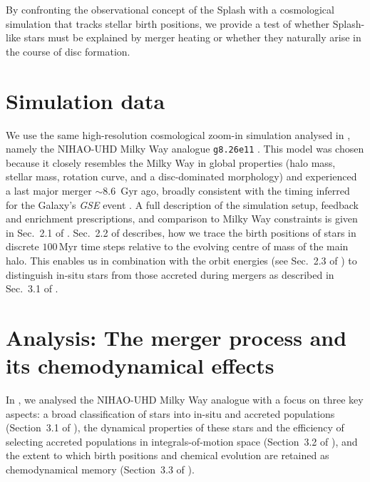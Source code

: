 \documentclass[fleqn,usenatbib]{mnras}
\begin{document}
By confronting the observational concept of the Splash with a cosmological simulation that tracks stellar birth positions, we provide a test of whether Splash-like stars must be explained by merger heating or whether they naturally arise in the course of disc formation.

\section{Simulation data}
\label{sec:data}

We use the same high-resolution cosmological zoom-in simulation analysed in , namely the NIHAO-UHD Milky Way analogue \texttt{g8.26e11} \citep{Wang2015, Buck2019b, Buck2020b, Buck2021}. This model was chosen because it closely resembles the Milky Way in global properties (halo mass, stellar mass, rotation curve, and a disc-dominated morphology) and experienced a last major merger $\sim 8.6$~Gyr ago, broadly consistent with the timing inferred for the Galaxy’s \textit{GSE} event \citep{Helmi2018, Naidu2020}. A full description of the simulation setup, feedback and enrichment prescriptions, and comparison to Milky Way constraints is given in Sec.~2.1 of . Sec.~2.2 of  describes, how we trace the birth positions of stars in discrete $100\,\mathrm{Myr}$ time steps relative to the evolving centre of mass of the main halo. This enables us in combination with the orbit energies (see Sec.~2.3 of ) to distinguish in-situ stars from those accreted during mergers as described in Sec.~3.1 of .

\section{Analysis: The merger process and its chemodynamical effects} \label{sec:analysis}

In , we analysed the NIHAO-UHD Milky Way analogue with a focus on three key aspects: a broad classification of stars into in-situ and accreted populations (Section~3.1 of ), the dynamical properties of these stars and the efficiency of selecting accreted populations in integrals-of-motion space (Section~3.2 of ), and the extent to which birth positions and chemical evolution are retained as chemodynamical memory (Section~3.3 of ). 
\end{document}
